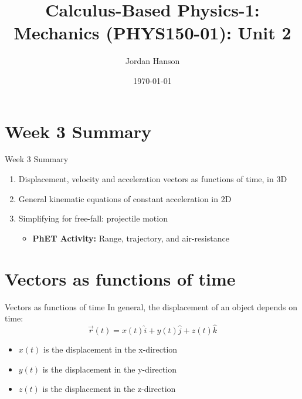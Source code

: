 \documentclass{beamer}
\title{Calculus-Based Physics-1: Mechanics (PHYS150-01): Unit 2}
\date{\today}
\author{Jordan Hanson}
\institute{Whittier College Department of Physics and Astronomy}
\begin{document}
\maketitle

\section{Week 3 Summary}

\begin{frame}{Week 3 Summary}
\begin{enumerate}
\item Displacement, velocity and acceleration vectors \alert{as functions of time}, in 3D
\item General kinematic equations of constant acceleration in 2D
\item Simplifying for free-fall: \alert{projectile motion}
\begin{itemize}
\item \textbf{PhET Activity:} Range, trajectory, and air-resistance
\end{itemize}
\end{enumerate}
\end{frame}

\section{Vectors as functions of time}

\begin{frame}{Vectors as functions of time}
In general, the displacement of an object depends on time:
\begin{equation}
\vec{r}(t) = x(t) \hat{i} + y(t) \hat{j} + z(t) \hat{k}
\end{equation}
\begin{itemize}
\item $x(t)$ is the displacement in the x-direction
\item $y(t)$ is the displacement in the y-direction
\item $z(t)$ is the displacement in the z-direction
\end{itemize}
\end{frame}
\end{document}
